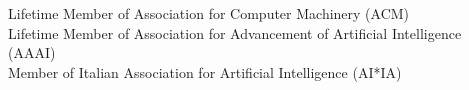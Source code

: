 Lifetime Member of  Association for Computer Machinery (ACM)\\ Lifetime Member of Association for Advancement of Artificial Intelligence (AAAI)\\ Member of  Italian Association for Artificial Intelligence (AI*IA)


